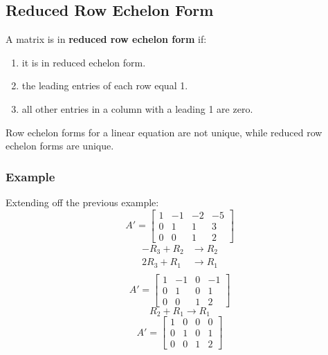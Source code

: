 \documentclass[letterpaper, 12pt]{math}
\begin{document}
\subsection*{Reduced Row Echelon Form}
A matrix is in \textbf{reduced row echelon form} if:
\begin{enumerate}
  \item it is in reduced echelon form.
  \item the leading entries of each row equal 1.
  \item all other entries in a column with a leading 1 are zero.
\end{enumerate}
Row echelon forms for a linear equation are not unique, while reduced row
echelon forms are unique.

\subsubsection*{Example}
Extending off the previous example:
\[ A' = \left[\begin{array}{ccc|c}
  1 & -1 & -2 & -5 \\
  0 & 1 & 1 & 3 \\
  0 & 0 & 1 & 2
\end{array}\right] \]
\begin{align*}
  -R_3+R_2 &\to R_2 \\
  2R_3+R_1 &\to R_1 \\
\end{align*}
\[ A' = \left[\begin{array}{ccc|c}
  1 & -1 & 0 & -1 \\
  0 & 1 & 0 & 1 \\
  0 & 0 & 1 & 2
\end{array}\right] \]
\[ R_2+R_1 \to R_1 \]
\[ A' = \left[\begin{array}{ccc|c}
  1 & 0 & 0 & 0 \\
  0 & 1 & 0 & 1 \\
  0 & 0 & 1 & 2
\end{array}\right] \]
\end{document}
